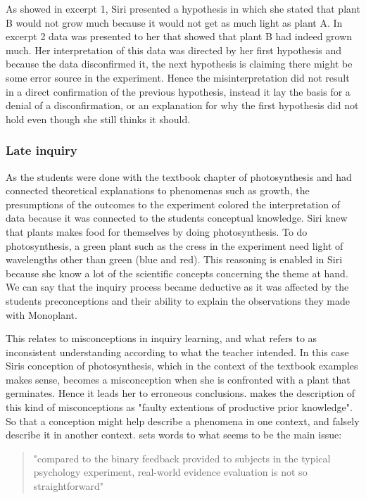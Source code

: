 As showed in excerpt 1, Siri presented a hypothesis in which she stated that plant B would not grow much because it would not get as much light as plant A. In excerpt 2 data was presented to her that showed that plant B had indeed grown much. Her interpretation of this data was directed by her first hypothesis and because the data disconfirmed it, the next hypothesis is claiming there might be some error source in the experiment. Hence the misinterpretation did not result in a direct confirmation of the previous hypothesis, instead it lay the basis for a denial of a disconfirmation, or an explanation for why the first hypothesis did not hold even though she still thinks it should.

\subsubsection*{Late inquiry}
As the students were done with the textbook chapter of photosynthesis and had connected theoretical explanations to phenomenas such as growth, the presumptions of the outcomes to the experiment colored the interpretation of data because it was connected to the students conceptual knowledge. Siri knew that plants makes food for themselves by doing photosynthesis. To do photosynthesis, a green plant such as the cress in the experiment need light of wavelengths other than green (blue and red). This reasoning is enabled in Siri because she know a lot of the scientific concepts concerning the theme at hand. We can say that the inquiry process became deductive as it was affected by the students preconceptions and their ability to explain the observations they made with Monoplant. 

This relates to misconceptions in inquiry learning, and what \citet{gomez2008elementary} refers to as inconsistent understanding according to what the teacher intended. In this case Siris conception of photosynthesis, which in the context of the textbook examples makes sense, becomes a misconception when she is confronted with a plant that germinates. Hence it leads her to erroneous conclusions. \citet{smith1994misconceptions} makes the description of this kind of misconceptions as "faulty extentions of productive prior knowledge". So that a conception might help describe a phenomena in one context, and falsely describe it in another context. \citeauthor{klahr1993heuristics} sets words to what seems to be the main issue: 

\begin{quote}"compared to the binary feedback provided to subjects in the typical psychology experiment, real-world evidence evaluation is not so straightforward" \citetext{\citet[p. 114]{klahr1993heuristics}, referenced in \citealp{de1998scientific}}
\end{quote}

